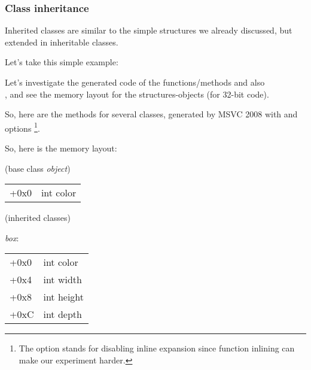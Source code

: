 \subsubsection{Class inheritance}
\label{cpp_inheritance}

Inherited classes are similar to the simple structures we already discussed, but extended 
in inheritable classes.

Let's take this simple example:



Let's investigate the generated code of the  functions/methods and also \\
,
and see the memory layout for the structures-objects (for 32-bit code).


So, here are the  methods for several classes, generated by MSVC 2008 with \Ox and \Obzero options
\footnote{The \Obzero option stands for disabling inline expansion since function inlining
can make our experiment harder.}.







So, here is the memory layout:

(base class \emph{object})

\begin{center}
\begin{tabular}{ | l | l | }
\hline
  \tableheader{} \\
\hline
  +0x0 & int color \\
\hline
\end{tabular}
\end{center}

(inherited classes)

\emph{box}:

\begin{center}
\begin{tabular}{ | l | l | }
\hline
  \tableheader{} \\
\hline
  +0x0 & int color \\
\hline
  +0x4 & int width \\
\hline
  +0x8 & int height \\
\hline
  +0xC & int depth \\
\hline
\end{tabular}
\end{center}


